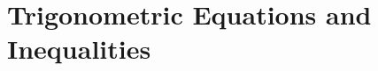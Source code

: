 \documentclass[../../main.tex]{subfiles}
\begin{document}
\chapter{Trigonometric Equations and Inequalities}
\end{document}
